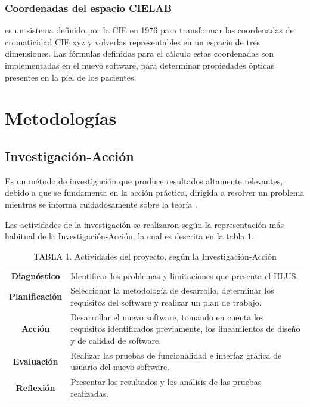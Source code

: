 \documentclass[conference]{IEEEtran}
\begin{document}
		\subsubsection{Coordenadas del espacio CIELAB}
		es un sistema definido por la CIE en 1976 \cite{CIE} para transformar las coordenadas de cromaticidad CIE xyz y volverlas representables en un espacio de tres dimensiones. Las f\'{o}rmulas definidas para el c\'{a}lculo estas coordenadas \cite{Schanda} son implementadas en el nuevo software, para determinar propiedades \'{o}pticas presentes en la piel de los pacientes.

\section{Metodolog\'{i}as}

	\subsection{Investigaci\'{o}n-Acci\'{o}n}
		Es un m\'{e}todo de investigaci\'{o}n que produce resultados altamente relevantes, debido a que se fundamenta en la acci\'{o}n pr\'{a}ctica, dirigida a resolver un problema mientras se informa cuidadosamente sobre la teor\'{i}a \cite{Baskerville}.
		
		Las actividades de la investigaci\'{o}n se realizaron seg\'{u}n la representaci\'{o}n m\'{a}s habitual de la Investigaci\'{o}n-Acci\'{o}n, la cual es descrita en la tabla 1.

\vfill

		\FloatBarrier %
		\begin{table}[htb]
			\caption{TABLA 1. Actividades del proyecto, seg\'{u}n la Investigaci\'{o}n-Acci\'{o}n}
			\label{tabla_1}
			\centering
			\setlength{\extrarowheight}{2.5pt}
			\begin{tabulary}{8.8cm}{|c|J|}
				\hline
				 & \\ \hline
				\textbf{Diagn\'{o}stico} & Identificar los problemas y limitaciones que presenta el HLUS.\\ \hline
				\textbf{Planificaci\'{o}n} & Seleccionar la metodolog\'{i}a de desarrollo, determinar los requisitos del software y realizar un plan de trabajo.
\\ \hline
				\textbf{Acci\'{o}n} & Desarrollar el nuevo software, tomando en cuenta los requisitos identificados previamente, los lineamientos de dise\~{n}o y de calidad de software.\\ \hline
				\textbf{Evaluaci\'{o}n} & Realizar las pruebas de funcionalidad e interfaz gr\'{a}fica de usuario del nuevo software.\\ \hline
				\textbf{Reflexi\'{o}n} & Presentar los resultados y los an\'{a}lisis de las pruebas realizadas.\\ \hline
			\end{tabulary}
		\end{table}
		\FloatBarrier %
\end{document}
